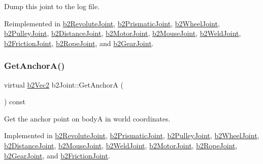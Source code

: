 Dump this joint to the log file. 



Reimplemented in \mbox{\hyperlink{classb2_revolute_joint_a408badabe21b169412a5c4a2f36bbbd8}{b2\+Revolute\+Joint}}, \mbox{\hyperlink{classb2_prismatic_joint_a843ddb0f912085f3deb3ee7320d7ddc7}{b2\+Prismatic\+Joint}}, \mbox{\hyperlink{classb2_wheel_joint_a8295644bd733c28c8c9fa6390a367f3f}{b2\+Wheel\+Joint}}, \mbox{\hyperlink{classb2_pulley_joint_a51b3fa745fc43f806cee1328099b4623}{b2\+Pulley\+Joint}}, \mbox{\hyperlink{classb2_distance_joint_a3cebcc6ccce6f3c24432cd130fd53517}{b2\+Distance\+Joint}}, \mbox{\hyperlink{classb2_motor_joint_abb67754f39b4747ae07af5cb5b348836}{b2\+Motor\+Joint}}, \mbox{\hyperlink{classb2_mouse_joint_aea1ff1e5b71ba5630875585cab1e2a96}{b2\+Mouse\+Joint}}, \mbox{\hyperlink{classb2_weld_joint_a59de1cad3229b41886bc23c4d6216e2f}{b2\+Weld\+Joint}}, \mbox{\hyperlink{classb2_friction_joint_a934a3ce5bda09bc07111c1dd4e192406}{b2\+Friction\+Joint}}, \mbox{\hyperlink{classb2_rope_joint_a0028d3d3710bf1a9a905e9b55a4f37c5}{b2\+Rope\+Joint}}, and \mbox{\hyperlink{classb2_gear_joint_a40ca34a7853db14d3978c0b18598dd8d}{b2\+Gear\+Joint}}.

\mbox{\label{classb2_joint_abe46ca3aad5db73909a9b5a7b2117447}} 
\subsubsection{\texorpdfstring{GetAnchorA()}{GetAnchorA()}}
{\footnotesize\ttfamily virtual \mbox{\hyperlink{structb2_vec2}{b2\+Vec2}} b2\+Joint\+::\+Get\+AnchorA (\begin{DoxyParamCaption}{ }\end{DoxyParamCaption}) const\hspace{0.3cm}{\ttfamily [pure virtual]}}



Get the anchor point on bodyA in world coordinates. 



Implemented in \mbox{\hyperlink{classb2_revolute_joint_a9878591c460a4e1575f8a77c237608ae}{b2\+Revolute\+Joint}}, \mbox{\hyperlink{classb2_prismatic_joint_abb6649d2a18abb209f68d5255cd6c606}{b2\+Prismatic\+Joint}}, \mbox{\hyperlink{classb2_pulley_joint_af7167643e6d72d879eea619a368194c1}{b2\+Pulley\+Joint}}, \mbox{\hyperlink{classb2_wheel_joint_a43a301e48ba486278932c82d3a98abd8}{b2\+Wheel\+Joint}}, \mbox{\hyperlink{classb2_distance_joint_ae228d3ce27009acd8a20c2570fb1183c}{b2\+Distance\+Joint}}, \mbox{\hyperlink{classb2_mouse_joint_a3c42531ac763bca3658a987d0ac7d2c4}{b2\+Mouse\+Joint}}, \mbox{\hyperlink{classb2_weld_joint_ac675d0b09a4d9567d85bcba8821785bc}{b2\+Weld\+Joint}}, \mbox{\hyperlink{classb2_motor_joint_a58adfab0fe79d254347a367341b0963a}{b2\+Motor\+Joint}}, \mbox{\hyperlink{classb2_rope_joint_a5757fdeb008bf1bbe15348e80aab9402}{b2\+Rope\+Joint}}, \mbox{\hyperlink{classb2_gear_joint_a2928d2e9eac9137808537faa9b30a649}{b2\+Gear\+Joint}}, and \mbox{\hyperlink{classb2_friction_joint_a8e0bf2e9eba24f326d060789fedc7278}{b2\+Friction\+Joint}}.

